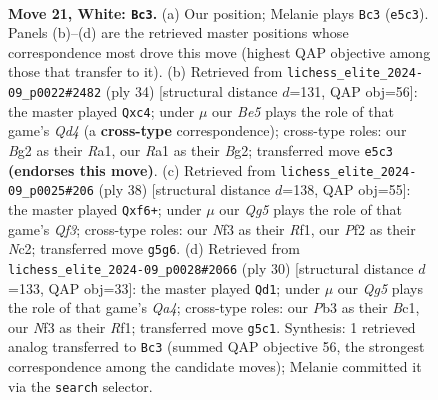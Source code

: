 \documentclass[11pt]{article}
\begin{document}
\clearpage

\begin{figure}[p]\centering
\begin{subfigure}{0.46\textwidth}\centering
\resizebox{\linewidth}{!}{%
\newchessgame
\chessboard[
  setfen={2b5/1p2qpkp/r4np1/p2rB1Q1/Pn6/NP3NP1/5PBP/R3R1K1 w - - 3 21},
  showmover=false,
  pgfstyle=straightmove, color=movearrow, markmove={e5-c3}
]}
\caption{}
\end{subfigure}\hfill
\begin{subfigure}{0.46\textwidth}\centering
\resizebox{\linewidth}{!}{%
\newchessgame
\chessboard[
  setfen={r1bqr3/1p3pkp/p4np1/8/P1pQ4/5NP1/1P2PPBP/R3R1K1 w - - 2 18},
  showmover=false,
  pgfstyle=straightmove, color=movearrow, markmove={d4-c4}
]}
\caption{}
\end{subfigure}
\\[4pt]
\begin{subfigure}{0.46\textwidth}\centering
\resizebox{\linewidth}{!}{%
\newchessgame
\chessboard[
  setfen={r6r/pp1b1kp1/4pqn1/n2p4/3P2P1/1P1B1Q2/P1N2P2/R1B2RK1 w - - 0 20},
  showmover=false,
  pgfstyle=straightmove, color=movearrow, markmove={f3-f6}
]}
\caption{}
\end{subfigure}\hfill
\begin{subfigure}{0.46\textwidth}\centering
\resizebox{\linewidth}{!}{%
\newchessgame
\chessboard[
  setfen={rnqr2k1/4bppp/p1n1p3/1pp5/Q7/P2P2P1/1P1NPPBP/R1B2RK1 w - - 0 16},
  showmover=false,
  pgfstyle=straightmove, color=movearrow, markmove={a4-d1}
]}
\caption{}
\end{subfigure}
\caption{\textbf{Move 21, White: \texttt{Bc3}.} (a) Our position; Melanie plays \texttt{Bc3} (\texttt{e5c3}). Panels (b)--(d) are the retrieved master positions whose correspondence most drove this move (highest QAP objective among those that transfer to it). (b) Retrieved from \texttt{lichess\_elite\_2024-09\_p0022\#2482} (ply 34) [structural distance $d$=131, QAP obj=56]: the master played \texttt{Qxc4}; under $\mu$ our \emph{Be5} plays the role of that game's \emph{Qd4} (a \textbf{cross-type} correspondence); cross-type roles: our \emph{B}g2 as their \emph{R}a1, our \emph{R}a1 as their \emph{B}g2; transferred move \texttt{e5c3} \textbf{(endorses this move)}. (c) Retrieved from \texttt{lichess\_elite\_2024-09\_p0025\#206} (ply 38) [structural distance $d$=138, QAP obj=55]: the master played \texttt{Qxf6+}; under $\mu$ our \emph{Qg5} plays the role of that game's \emph{Qf3}; cross-type roles: our \emph{N}f3 as their \emph{R}f1, our \emph{P}f2 as their \emph{N}c2; transferred move \texttt{g5g6}. (d) Retrieved from \texttt{lichess\_elite\_2024-09\_p0028\#2066} (ply 30) [structural distance $d$=133, QAP obj=33]: the master played \texttt{Qd1}; under $\mu$ our \emph{Qg5} plays the role of that game's \emph{Qa4}; cross-type roles: our \emph{P}b3 as their \emph{B}c1, our \emph{N}f3 as their \emph{R}f1; transferred move \texttt{g5c1}. Synthesis: 1 retrieved analog transferred to \texttt{Bc3} (summed QAP objective 56, the strongest correspondence among the candidate moves); Melanie committed it via the \texttt{search} selector.}
\label{fig:thought-m40}
\end{figure}
\end{document}
